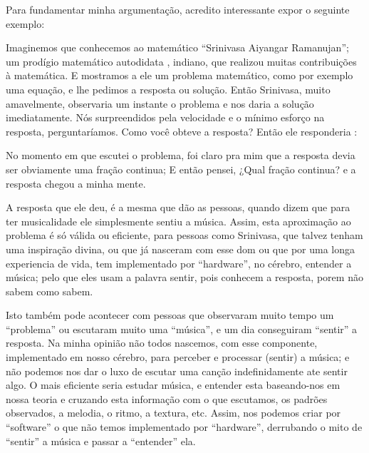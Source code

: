 Para fundamentar minha argumentação, acredito interessante expor o seguinte exemplo: 
\begin{example}
Imaginemos que conhecemos ao matemático ``Srinivasa Aiyangar Ramanujan'';
um prodígio matemático autodidata \cite[pp. 1]{kanigel2016man}, indiano, que 
realizou muitas contribuições à matemática.
E mostramos a ele um problema matemático, como por exemplo uma equação,
e  lhe pedimos a resposta ou solução. 
Então Srinivasa, muito amavelmente, 
observaria um instante o problema e nos daria a solução imediatamente.
Nós surpreendidos pela velocidade e o mínimo esforço na resposta,
perguntaríamos. Como você obteve a resposta? Então ele responderia \cite[pp. 235]{kanigel2016man}: 
\begin{citando}
No momento em que escutei o problema, 
foi claro pra mim que a resposta devia ser obviamente uma fração continua; 
E então pensei, ¿Qual fração continua? e a resposta chegou a minha mente. 
\end{citando}
\end{example}

A resposta que ele deu, 
é a mesma  que dão as pessoas, quando  dizem que para ter musicalidade ele simplesmente sentiu a música. 
Assim, esta aproximação ao problema é só válida ou eficiente, para pessoas como Srinivasa, 
que talvez tenham uma inspiração divina, 
ou que já nasceram com esse dom ou que por uma longa experiencia de vida, 
tem implementado por ``hardware'', no cérebro, entender a música; 
pelo que eles usam a palavra sentir, 
pois conhecem a resposta, porem não sabem como sabem. 

Isto também pode acontecer com pessoas que observaram muito tempo um ``problema'' ou escutaram muito uma ``música'', 
e um dia conseguiram ``sentir'' a resposta. Na minha opinião não todos nascemos, 
com esse componente, implementado em nosso cérebro, para perceber e processar (sentir) a música; 
e não podemos nos dar o luxo de escutar uma canção indefinidamente ate sentir algo. 
O mais eficiente seria estudar música, 
e entender esta baseando-nos em nossa teoria e cruzando esta informação com o que escutamos, 
os padrões observados, a melodia, o ritmo, a textura, etc. 
Assim, nos podemos criar por ``software'' o que não temos implementado por ``hardware'', 
derrubando o mito de ``sentir'' a música e passar a ``entender'' ela.

